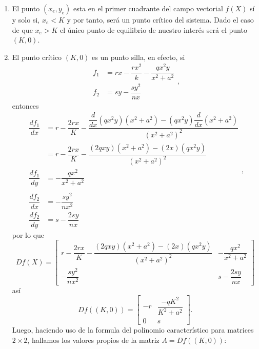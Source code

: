 {	\begin{enumerate}
		\item El punto $(x_{e}, y_{e})$ esta en el primer cuadrante del campo vectorial $f(X)$ sí y solo si, $x_{e}<K$ y por tanto, será un punto crítico del sistema. Dado el caso de que $x_{e}>K$ el único punto de equilibrio de nuestro interés será el punto $(K,0)$.
		\item El punto crítico $(K,0)$ es un punto silla, en efecto, si
		\begin{equation}
			\begin{aligned}
				f_{1} &= rx - \dfrac{rx^{2}}{k} - \dfrac{qx^{2}y}{x^{2}+a^{2}} \\
				f_{2} &= sy - \dfrac{sy^{2}}{nx}
			\end{aligned},
		\end{equation}
		entonces
		\begin{equation}
			\begin{aligned}
				\dfrac{df_{1}}{dx} &= r - \dfrac{2rx}{K} - \dfrac{\dfrac{d}{dx}(qx^{2}y)(x^{2}+a^{2})-(qx^{2}y)\dfrac{d}{dx}(x^{2}+a^{2})}{(x^{2}+a^{2})^{2}} \\
				&= r - \dfrac{2rx}{K} - \dfrac{(2qxy)(x^{2}+a^{2})-(2x)(qx^{2}y)}{(x^{2}+a^{2})^{2}} \\
				\dfrac{df_{1}}{dy} &= - \dfrac{qx^{2}}{x^{2}+a^{2}} \\ \\
				\dfrac{df_{2}}{dx} &= - \dfrac{sy^{2}}{nx^{2}} \\
				\dfrac{df_{2}}{dy} &= s - \dfrac{2sy}{nx} 
			\end{aligned},
		\end{equation}
		por lo que 
		\begin{equation}
			Df(X) = 
			\begin{bmatrix}
				r - \dfrac{2rx}{K} - \dfrac{(2qxy)(x^{2}+a^{2})-(2x)(qx^{2}y)}{(x^{2}+a^{2})^{2}} & - \dfrac{qx^{2}}{x^{2}+a^{2}} \\
				- \dfrac{sy^{2}}{nx^{2}} & s - \dfrac{2sy}{nx}
			\end{bmatrix}
		\end{equation}
		así
		\begin{equation}
			Df((K,0)) =
			\begin{bmatrix}
				-r & \dfrac{-qK^{2}}{K^{2}+a^{2}} \\
				0 & s
			\end{bmatrix}.
		\end{equation}
		Luego, haciendo uso de la formula del polinomio característico para matrices $2 \times 2$, hallamos los valores propios de la matriz $A = Df((K,0))$:

\end{enumerate}}

